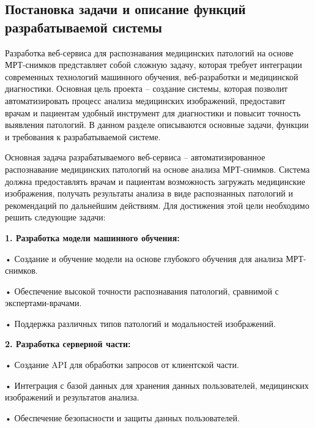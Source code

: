 \subtitlespace

\subsection*{ 
  \gostTitleFont
   Постановка задачи и описание функций разрабатываемой системы 
} 

\subtitlespace

{\gostFont

  \par \redline Разработка веб-сервиса для распознавания медицинских патологий на основе МРТ-снимков представляет собой сложную задачу, которая требует интеграции современных технологий машинного обучения, веб-разработки и медицинской диагностики. Основная цель проекта – создание системы, которая позволит автоматизировать процесс анализа медицинских изображений, предоставит врачам и пациентам удобный инструмент для диагностики и повысит точность выявления патологий. В данном разделе описываются основные задачи, функции и требования к разрабатываемой системе.

  \par \redline Основная задача разрабатываемого веб-сервиса – автоматизированное распознавание медицинских патологий на основе анализа МРТ-снимков. Система должна предоставлять врачам и пациентам возможность загружать медицинские изображения, получать результаты анализа в виде распознанных патологий и рекомендаций по дальнейшим действиям. Для достижения этой цели необходимо решить следующие задачи:

  \par \redline \textbf{1. Разработка модели машинного обучения:}
  \par \redline \hspace{0.3cm} • Создание и обучение модели на основе глубокого обучения для анализа МРТ-снимков.
  \par \redline \hspace{0.3cm} • Обеспечение высокой точности распознавания патологий, сравнимой с экспертами-врачами.
  \par \redline \hspace{0.3cm} • Поддержка различных типов патологий и модальностей изображений.

  \par \redline \textbf{2. Разработка серверной части:}
  \par \redline \hspace{0.3cm} • Создание API для обработки запросов от клиентской части.
  \par \redline \hspace{0.3cm} • Интеграция с базой данных для хранения данных пользователей, медицинских изображений и результатов анализа.
  \par \redline \hspace{0.3cm} • Обеспечение безопасности и защиты данных пользователей.

}
